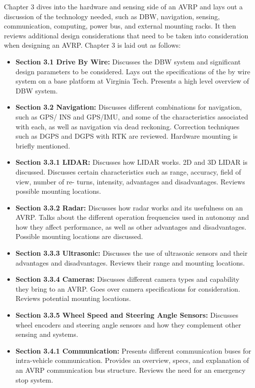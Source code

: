 Chapter 3 dives into the hardware and sensing side of an AVRP and lays out a discussion of the technology needed, such as DBW, navigation, sensing, communication, computing, power bus, and external mounting racks. It then reviews additional design considerations that need to be taken into consideration when designing an AVRP. Chapter 3 is laid out as follows:
\begin{itemize}
\item \textbf {Section 3.1 Drive By Wire:} Discusses the DBW system and significant design parameters to be considered. Lays out the specifications of the by wire system on a base platform at Virginia Tech. Presents a high level overview of DBW system.
\item \textbf {Section 3.2 Navigation:} Discusses different combinations for navigation, such as GPS/ INS and GPS/IMU, and some of the characteristics associated with each, as well as navigation via dead reckoning. Correction techniques such as DGPS and DGPS with RTK are reviewed. Hardware mounting is briefly mentioned.
\item \textbf {Section 3.3.1 LIDAR:} Discusses how LIDAR works. 2D and 3D LIDAR is discussed. Discusses certain characteristics such as range, accuracy, field of view, number of re- turns, intensity, advantages and disadvantages. Reviews possible mounting locations.
\item \textbf {Section 3.3.2 Radar:} Discusses how radar works and its usefulness on an AVRP. Talks about the different operation frequencies used in autonomy and how they affect performance, as well as other advantages and disadvantages. Possible mounting locations are discussed.
\item \textbf {Section 3.3.3 Ultrasonic:} Discusses the use of ultrasonic sensors and their advantages and disadvantages. Reviews their range and mounting locations.
\item \textbf {Section 3.3.4 Cameras:} Discusses different camera types and capability they bring to an AVRP. Goes over camera specifications for consideration. Reviews potential mounting locations.
\item \textbf {Section 3.3.5 Wheel Speed and Steering Angle Sensors: }Discusses wheel encoders and steering angle sensors and how they complement other sensing and systems.
\item \textbf {Section 3.4.1 Communication:} Presents different communication buses for intra-vehicle communication. Provides an overview, specs, and explanation of an AVRP communication bus structure. Reviews the need for an emergency stop system.

\end{itemize}
